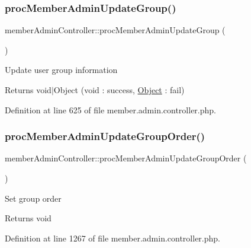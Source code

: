 \hypertarget{classmemberAdminController_a8d14fe0f7df63dbce5cc50d61d452635}{}\label{classmemberAdminController_a8d14fe0f7df63dbce5cc50d61d452635} 
\subsubsection{\texorpdfstring{proc\+Member\+Admin\+Update\+Group()}{procMemberAdminUpdateGroup()}}
{\footnotesize\ttfamily member\+Admin\+Controller\+::proc\+Member\+Admin\+Update\+Group (\begin{DoxyParamCaption}{ }\end{DoxyParamCaption})}

Update user group information \begin{DoxyReturn}{Returns}
void$\vert$\+Object (void \+: success, \hyperlink{classObject}{Object} \+: fail) 
\end{DoxyReturn}


Definition at line 625 of file member.\+admin.\+controller.\+php.

\hypertarget{classmemberAdminController_abadf39e3363281d5b04444aec0801a2b}{}\label{classmemberAdminController_abadf39e3363281d5b04444aec0801a2b} 
\subsubsection{\texorpdfstring{proc\+Member\+Admin\+Update\+Group\+Order()}{procMemberAdminUpdateGroupOrder()}}
{\footnotesize\ttfamily member\+Admin\+Controller\+::proc\+Member\+Admin\+Update\+Group\+Order (\begin{DoxyParamCaption}{ }\end{DoxyParamCaption})}

Set group order \begin{DoxyReturn}{Returns}
void 
\end{DoxyReturn}


Definition at line 1267 of file member.\+admin.\+controller.\+php.

